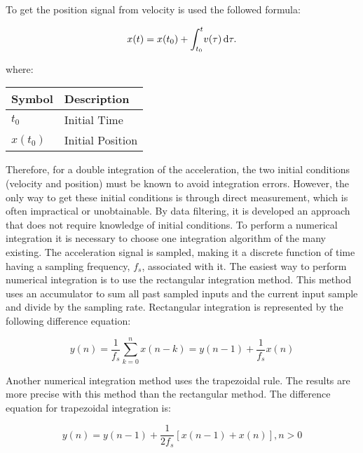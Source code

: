 \documentclass[tesi]{subfiles}
\begin{document}
\noindent To get the position signal from velocity is used the followed formula:
\begin{center}
\begin{equation}
 {\large x(t) = x(t_{0}) + \int_{t_{0}}^{t} \! v(\tau) \, \mathrm{d}\tau.}
\end{equation}

where: 
\begin{table}[ht]
\centering
    \begin{tabular}{ | l | l |}
    
    \hline
    Symbol & Description \\ \hline
   \quad  $t_{0}$ & Initial Time \\ \hline
	   \quad  $x(t_{0})$ & Initial Position \\  
\hline 
    \end{tabular}
\end{table}
\end{center}
Therefore, for a double integration of the acceleration, the two initial
conditions (velocity and position) must be known to avoid integration errors. However,
the only way to get these initial conditions is through direct measurement, which is often
impractical or unobtainable. By  data filtering, it is developed an approach that does not require knowledge of initial conditions.
To perform a numerical integration it is necessary to choose one integration algorithm of the many existing. 
The acceleration signal is sampled, making it a discrete function of time having a sampling frequency, $f_{s}$, associated with it. The easiest way to perform numerical integration is to use the rectangular integration method. This method uses an accumulator to sum all past sampled inputs and the current input sample and divide by the sampling rate. Rectangular integration is represented by the following difference equation:

\begin{equation} 
y(n) = \dfrac{1}{f_{s}} \sum_{k=0}^{n} x(n-k) = y(n-1) + \dfrac{1}{f_{s}} x(n)
\end{equation}\label{eq:rectangular}


Another numerical integration method uses the trapezoidal rule. 
The results are more precise with this method than the rectangular method. The difference equation for trapezoidal integration is:

\begin{equation}
y(n) = y(n-1) + \dfrac{1}{2 f_{s}}[x(n-1) + x(n)], n > 0
\end{equation}\label{eq:trapezoidal}
\end{document}
